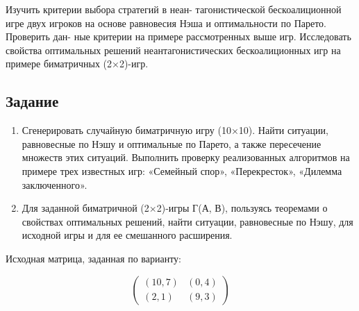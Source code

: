 
Изучить критерии выбора стратегий в неан- тагонистической бескоалиционной игре двух
игроков на основе равновесия Нэша и оптимальности по Парето. Проверить дан-
ные критерии на примере рассмотренных выше игр. Исследовать свойства оптимальных
решений неантагонистических бескоалиционных игр на примере биматричных (2×2)-игр.

\subsection*{Задание}

\begin{enumerate}
    \item Сгенерировать случайную биматричную игру (10×10). Найти ситуации, равновесные
    по Нэшу и оптимальные по Парето, а также пересечение множеств этих ситуаций. Выполнить
    проверку реализованных алгоритмов на примере трех известных
    игр: «Семейный спор», «Перекресток», «Дилемма заключенного».
    \item Для заданной биматричной (2×2)-игры Г(А, В), пользуясь теоремами о свойствах
    оптимальных решений, найти ситуации, равновесные по Нэшу, для исходной игры и для ее смешанного
    расширения.
\end{enumerate}

Исходная матрица, заданная по варианту:

\[
\begin{pmatrix}
(10, 7) & (0, 4) \\
(2, 1) & (9, 3)
\end{pmatrix}
\]
